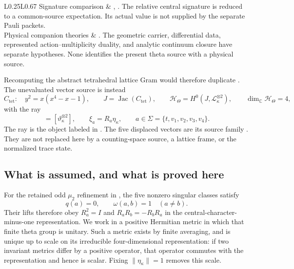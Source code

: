\documentclass[11pt]{article}
\theoremstyle{definition}
\theoremstyle{remark}
\newcommand{\C}{\mathbb C}
\newcommand{\HH}{\mathcal H}
\newcommand{\norm}[1]{\lVert#1\rVert}
\begin{document}
\begin{longtable}{L{0.25\textwidth}L{0.67\textwidth}}
Signature comparison & \cite{AD9}, . The relative central signature is reduced to a common-source expectation. Its actual value is not supplied by the separate Pauli packets.\\
Physical companion theories & \cite{Spacetime,Spectral,Duality,Variational}. The geometric carrier, differential data, represented action--multiplicity duality, and analytic continuum closure have separate hypotheses. None identifies the present theta source with a physical source.\\
\bottomrule
\end{longtable}

Recomputing the abstract tetrahedral lattice Gram would therefore duplicate \cite{AD9}. The unevaluated vector source is instead
\begin{equation}
 C_{\mathrm{tet}}:\quad y^2=x(x^4-x-1),\qquad
 J=\operatorname{Jac}(C_{\mathrm{tet}}),\qquad
 \HH_\Theta=H^0(J,\mathcal L_\kappa^{\otimes2}),
 \qquad \dim_\C\HH_\Theta=4,
 \label{eq:theta-input}
\end{equation}
with the ray
\begin{equation}
 [\eta_\kappa]=[\vartheta_\kappa^{\otimes2}],\qquad
 \xi_a=R_a\eta_\kappa,\qquad
 a\in\Sigma=\{t,v_1,v_2,v_3,v_4\}.
 \label{eq:actual-source}
\end{equation}
The ray is the object labeled  in \cite{AD9}. The five displaced vectors are its source family . They are not replaced here by a counting-space source, a lattice frame, or the normalized trace state.

\subsection{What is assumed, and what is proved here}
For the retained odd $\mu_2$ refinement in \cite{AD9}, the five nonzero singular classes satisfy
\begin{equation}
 q(a)=0,\qquad \omega(a,b)=1\quad(a\ne b).
 \label{eq:singular-input}
\end{equation}
Their lifts therefore obey $R_a^2=I$ and $R_aR_b=-R_bR_a$ in the central-character-minus-one representation. We work in a positive Hermitian metric in which that finite theta group is unitary. Such a metric exists by finite averaging, and is unique up to scale on its irreducible four-dimensional representation: if two invariant metrics differ by a positive operator, that operator commutes with the representation and hence is scalar. Fixing $\norm{\eta_\kappa}=1$ removes this scale.
\end{document}
